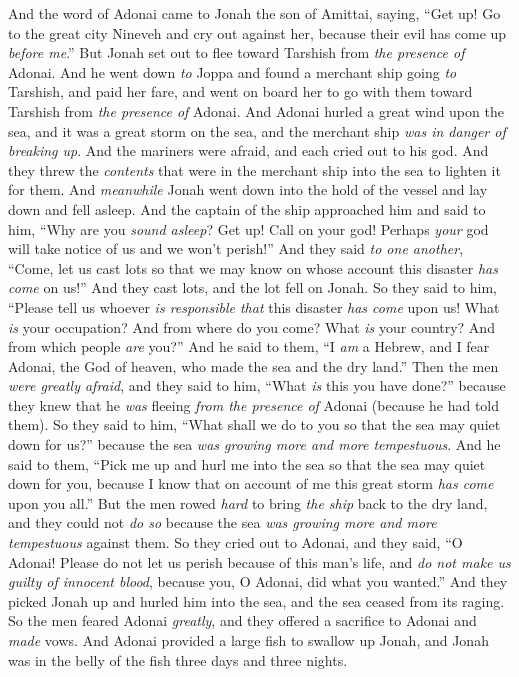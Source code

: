 
\begin{biblechapter} %
 And the word of Adonai came to Jonah the son of Amittai, saying,
\verse “Get up! Go to the great city Nineveh and cry out against her, because their evil has come up \textit{before me}.”
\verse But Jonah set out to flee toward Tarshish from \textit{the presence of} Adonai. And he went down \textit{to} Joppa and found a merchant ship going \textit{to} Tarshish, and paid her fare, and went on board her to go with them toward Tarshish from \textit{the presence of} Adonai.
\verse And Adonai hurled a great wind upon the sea, and it was a great storm on the sea, and the merchant ship \textit{was in danger of breaking up}.
\verse And the mariners were afraid, and each cried out to his god. And they threw the \textit{contents} that were in the merchant ship into the sea to lighten it for them. And \textit{meanwhile} Jonah went down into the hold of the vessel and lay down and fell asleep.
\verse And the captain of the ship approached him and said to him, “Why are you \textit{sound asleep}? Get up! Call on your god! Perhaps \textit{your} god will take notice of us and we won’t perish!”
\verse And they said \textit{to one another}, “Come, let us cast lots so that we may know on whose account this disaster \textit{has come} on us!” And they cast lots, and the lot fell on Jonah.
\verse So they said to him, “Please tell us whoever \textit{is responsible that} this disaster \textit{has come} upon us! What \textit{is} your occupation? And from where do you come? What \textit{is} your country? And from which people \textit{are} you?”
\verse And he said to them, “I \textit{am} a Hebrew, and I fear Adonai, the God of heaven, who made the sea and the dry land.”
\verse Then the men \textit{were greatly afraid}, and they said to him, “What \textit{is} this you have done?” because they knew that he \textit{was} fleeing \textit{from the presence of} Adonai (because he had told them).
\verse So they said to him, “What shall we do to you so that the sea may quiet down for us?” because the sea \textit{was growing more and more tempestuous}.
\verse And he said to them, “Pick me up and hurl me into the sea so that the sea may quiet down for you, because I know that on account of me this great storm \textit{has come} upon you all.”
\verse But the men rowed \textit{hard} to bring \textit{the ship} back to the dry land, and they could not \textit{do so} because the sea \textit{was growing more and more tempestuous} against them.
\verse So they cried out to Adonai, and they said, “O Adonai! Please do not let us perish because of this man’s life, and \textit{do not make us guilty of innocent blood}, because you, O Adonai, did what you wanted.”
\verse And they picked Jonah up and hurled him into the sea, and the sea ceased from its raging.
\verse So the men feared Adonai \textit{greatly}, and they offered a sacrifice to Adonai and \textit{made} vows.
  And Adonai provided a large fish to swallow up Jonah, and Jonah was in the belly of the fish three days and three nights.
\end{biblechapter}

